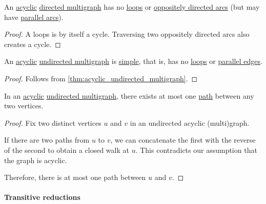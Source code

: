 \begin{proposition}\label{thm:acyclic_directed_multigraph}
  An \hyperref[def:acyclic_graph]{acyclic} \hyperref[def:directed_multigraph]{directed multigraph} has no \hyperref[def:directed_multigraph/loop]{loops} or \hyperref[def:directed_multigraph/parallel_arcs]{oppositely directed arcs} (but may have \hyperref[def:directed_multigraph/parallel_arcs]{parallel arcs}).
\end{proposition}
\begin{proof}
  A loops is by itself a cycle. Traversing two oppositely directed arcs also creates a cycle.
\end{proof}

\begin{proposition}\label{thm:acyclic_undirected_multigraph}
  An \hyperref[def:acyclic_graph]{acyclic} \hyperref[def:hypergraph/multigraph]{undirected multigraph} is \hyperref[def:undirected_graph]{simple}, that is, has no \hyperref[def:hypergraph/loop]{loops} or \hyperref[def:hypergraph/parallel]{parallel edges}.
\end{proposition}
\begin{proof}
  Follows from \cref{thm:acyclic_undirected_multigraph}.
\end{proof}

\begin{proposition}\label{thm:acyclic_graph_paths}
  In an \hyperref[def:acyclic_graph]{acyclic} \hyperref[def:hypergraph/multigraph]{undirected multigraph}, there exists at most one \hyperref[def:graph_walk/path]{path} between any two vertices.
\end{proposition}
\begin{proof}
  Fix two distinct vertices \( u \) and \( v \) in an undirected acyclic (multi)graph.

  If there are two paths from \( u \) to \( v \), we can concatenate the first with the reverse of the second to obtain a closed walk at \( u \). This contradicts our assumption that the graph is acyclic.

  Therefore, there is at most one path between \( u \) and \( v \).
\end{proof}

\paragraph{Transitive reductions}

